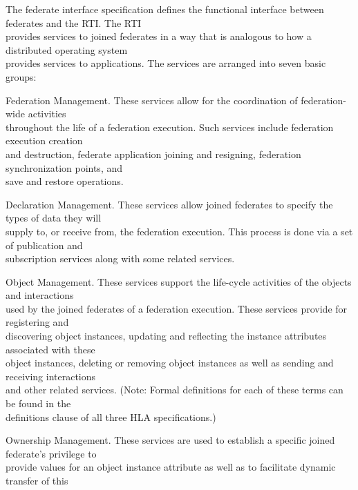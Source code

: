 \vspace{1.8pt}
The federate interface specification defines the functional interface between federates and the RTI. The RTI\\
provides services to joined federates in a way that is analogous to how a distributed operating system\\
provides services to applications. The services are arranged into seven basic groups:

\vspace{4.1pt}
\begin{hlalist}
    \item Federation Management. These services allow for the coordination of federation-wide activities\\
    throughout the life of a federation execution. Such services include federation execution creation\\
    and destruction, federate application joining and resigning, federation synchronization points, and\\
    save and restore operations.
    \item Declaration Management. These services allow joined federates to specify the types of data they will\\
    supply to, or receive from, the federation execution. This process is done via a set of publication and\\
    subscription services along with some related services.
    \item Object Management. These services support the life-cycle activities of the objects and interactions\\
    used by the joined federates of a federation execution. These services provide for registering and\\
    discovering object instances, updating and reflecting the instance attributes associated with these\\
    object instances, deleting or removing object instances as well as sending and receiving interactions\\
    and other related services. (Note: Formal definitions for each of these terms can be found in the\\
    definitions clause of all three HLA specifications.)
    \item Ownership Management. These services are used to establish a specific joined federate's privilege to\\
    provide values for an object instance attribute as well as to facilitate dynamic transfer of this\\

\end{hlalist}
